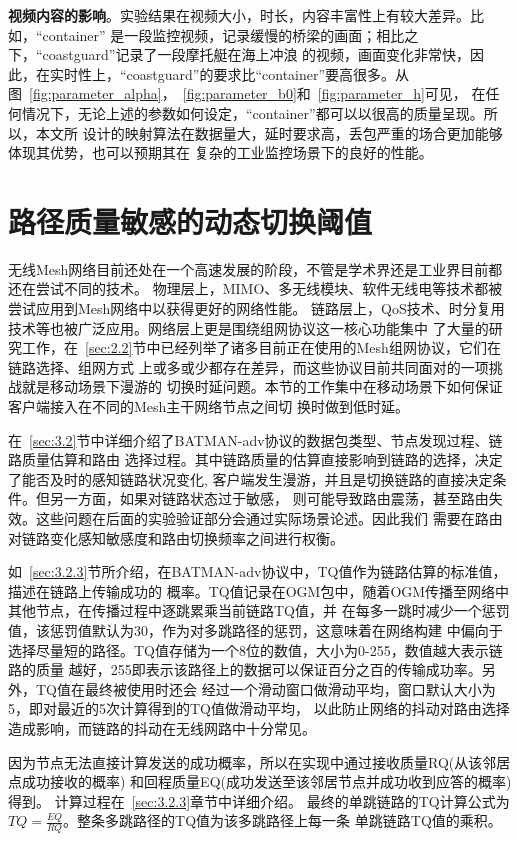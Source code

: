 \textbf{视频内容的影响}。实验结果在视频大小，时长，内容丰富性上有较大差异。比如，“container”
是一段监控视频，记录缓慢的桥梁的画面；相比之下，“coastguard”记录了一段摩托艇在海上冲浪
的视频，画面变化非常快，因此，在实时性上，“coastguard”的要求比“container”要高很多。从
图~\ref{fig:parameter_alpha}，~\ref{fig:parameter_b0}和~\ref{fig:parameter_h}可见，
在任何情况下，无论上述的参数如何设定，“container”都可以以很高的质量呈现。所以，本文所
设计的映射算法在数据量大，延时要求高，丢包严重的场合更加能够体现其优势，也可以预期其在
复杂的工业监控场景下的良好的性能。


\section{路径质量敏感的动态切换阈值}
\label{sec:3}
无线Mesh网络目前还处在一个高速发展的阶段，不管是学术界还是工业界目前都还在尝试不同的技术。
物理层上，MIMO、多无线模块、软件无线电等技术都被尝试应用到Mesh网络中以获得更好的网络性能。
链路层上，QoS技术、时分复用技术等也被广泛应用。网络层上更是围绕组网协议这一核心功能集中
了大量的研究工作，在~\ref{sec:2.2}节中已经列举了诸多目前正在使用的Mesh组网协议，它们在链路选择、组网方式
上或多或少都存在差异，而这些协议目前共同面对的一项挑战就是移动场景下漫游的
切换时延问题。本节的工作集中在移动场景下如何保证客户端接入在不同的Mesh主干网络节点之间切
换时做到低时延。

在~\ref{sec:3.2}节中详细介绍了BATMAN-adv协议的数据包类型、节点发现过程、链路质量估算和路由
选择过程。其中链路质量的估算直接影响到链路的选择，决定了能否及时的感知链路状况变化,
客户端发生漫游，并且是切换链路的直接决定条件。但另一方面，如果对链路状态过于敏感，
则可能导致路由震荡，甚至路由失效。这些问题在后面的实验验证部分会通过实际场景论述。因此我们
需要在路由对链路变化感知敏感度和路由切换频率之间进行权衡。

如~\ref{sec:3.2.3}节所介绍，在BATMAN-adv协议中，TQ值作为链路估算的标准值，描述在链路上传输成功的
概率。TQ值记录在OGM包中，随着OGM传播至网络中其他节点，在传播过程中逐跳累乘当前链路TQ值，并
在每多一跳时减少一个惩罚值，该惩罚值默认为30，作为对多跳路径的惩罚，这意味着在网络构建
中偏向于选择尽量短的路径。TQ值存储为一个8位的数值，大小为0-255，数值越大表示链路的质量
越好，255即表示该路径上的数据可以保证百分之百的传输成功率。另外，TQ值在最终被使用时还会
经过一个滑动窗口做滑动平均，窗口默认大小为5，即对最近的5次计算得到的TQ值做滑动平均，
以此防止网络的抖动对路由选择造成影响，而链路的抖动在无线网路中十分常见。

因为节点无法直接计算发送的成功概率，所以在实现中通过接收质量RQ(从该邻居点成功接收的概率)
和回程质量EQ(成功发送至该邻居节点并成功收到应答的概率)得到。
计算过程在~\ref{sec:3.2.3}章节中详细介绍。
最终的单跳链路的TQ计算公式为$TQ=\frac{EQ}{RQ}$。整条多跳路径的TQ值为该多跳路径上每一条
单跳链路TQ值的乘积。

